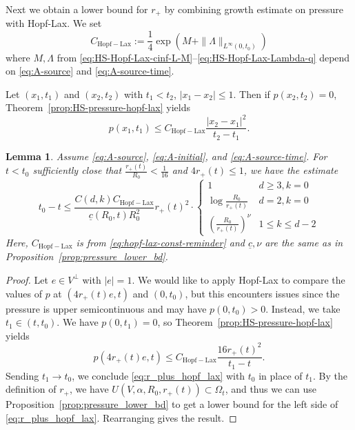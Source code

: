 \documentclass[11pt]{amsart}
\numberwithin{equation}{section}
\numberwithin{figure}{section}
\theoremstyle{plain}
\newtheorem{lem}[thm]{Lemma}
\theoremstyle{definition}
\theoremstyle{remark}
\theoremstyle{plain}
\begin{document}
Next we obtain a lower bound for $r_+$ by combining growth estimate on pressure with Hopf-Lax. We set
\begin{equation}\label{eq:hopf-lax-const-reminder}
    C_{\mathrm{Hopf-Lax}} := \frac{1}{4}\exp(M + \|\Lambda\|_{L^\infty(0,t_0)})
\end{equation}
where $M, \Lambda$ from \eqref{eq:HS-Hopf-Lax-cinf-L-M}--\eqref{eq:HS-Hopf-Lax-Lambda-q} depend on \eqref{eq:A-source} and \eqref{eq:A-source-time}.

Let $(x_1, t_1)$ and $(x_2,t_2)$ with $t_1 < t_2$, $|x_1 - x_2| \leq 1$. Then if $p(x_2, t_2) = 0$, Theorem~\ref{prop:HS-pressure-hopf-lax} yields
\[ p(x_1, t_1) \leq C_{\mathrm{Hopf-Lax}}\frac{|x_2-x_1|^2}{t_2 - t_1}. \]

\begin{lem}\label{lem:r_plus_lower_bd}
Assume \eqref{eq:A-source}, \eqref{eq:A-initial}, and \eqref{eq:A-source-time}. For $t < t_0$ sufficiently close that $\frac{r_+(t)}{R_0} < \frac{1}{16}$ and $4r_+(t) \leq 1$, we have the estimate
\begin{equation}
    t_0 - t \leq \frac{C(d,k)C_{\mathrm{Hopf-Lax}}}{\underline{c}(R_0,t)R_0^2}r_+(t)^2\cdot\begin{cases}
        1 & d\geq 3, k=0 \\
        \log\frac{R_0}{r_+(t)} & d=2, k=0 \\
        (\tfrac{R_0}{r_+(t)})^{\nu} & 1 \leq k \leq d-2
    \end{cases}
\end{equation}
Here, $C_{\mathrm{Hopf-Lax}}$ is from \eqref{eq:hopf-lax-const-reminder} and $\underline{c},\nu$ are the same as in Proposition~\ref{prop:pressure_lower_bd}.
\end{lem}
\begin{proof}
Let $e\in V^\perp$ with $|e| = 1$. We would like to apply Hopf-Lax to compare the values of $p$ at $(4r_+(t)e, t)$ and $(0, t_0)$, but this encounters issues since the pressure is upper semicontinuous and may have $p(0, t_0) > 0$. Instead, we take $t_1 \in (t, t_0)$. We have $p(0, t_1) = 0$, so Theorem~\ref{prop:HS-pressure-hopf-lax} yields
\begin{equation}\label{eq:r_plus_hopf_lax}
    p(4r_+(t)e, t) \leq C_{\mathrm{Hopf-Lax}}\frac{16r_+(t)^2}{t_1 - t}.
\end{equation}
Sending $t_1\to t_0$, we conclude \eqref{eq:r_plus_hopf_lax} with $t_0$ in place of $t_1$. By the definition of $r_+$, we have $U(V, \alpha, R_0,r_+(t))\subset \Omega_t$, and thus we can use Proposition~\ref{prop:pressure_lower_bd} to get a lower bound for the left side of \eqref{eq:r_plus_hopf_lax}. Rearranging gives the result.
\end{proof}
\end{document}
